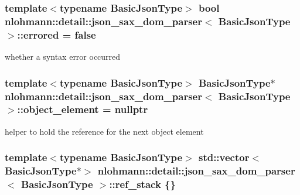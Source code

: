 \subsubsection[{\texorpdfstring{errored}{errored}}]{\setlength{\rightskip}{0pt plus 5cm}template$<$typename Basic\+Json\+Type$>$ bool {\bf nlohmann\+::detail\+::json\+\_\+sax\+\_\+dom\+\_\+parser}$<$ Basic\+Json\+Type $>$\+::errored = false\hspace{0.3cm}{\ttfamily [private]}}\hypertarget{classnlohmann_1_1detail_1_1json__sax__dom__parser_a31ccb472ed855e2f2370fd091d91aad7}{}\label{classnlohmann_1_1detail_1_1json__sax__dom__parser_a31ccb472ed855e2f2370fd091d91aad7}


whether a syntax error occurred 

\subsubsection[{\texorpdfstring{object\+\_\+element}{object_element}}]{\setlength{\rightskip}{0pt plus 5cm}template$<$typename Basic\+Json\+Type$>$ Basic\+Json\+Type$\ast$ {\bf nlohmann\+::detail\+::json\+\_\+sax\+\_\+dom\+\_\+parser}$<$ Basic\+Json\+Type $>$\+::object\+\_\+element = nullptr\hspace{0.3cm}{\ttfamily [private]}}\hypertarget{classnlohmann_1_1detail_1_1json__sax__dom__parser_a9c03c76d3a8e89c8928097ba0b92c2db}{}\label{classnlohmann_1_1detail_1_1json__sax__dom__parser_a9c03c76d3a8e89c8928097ba0b92c2db}


helper to hold the reference for the next object element 

\subsubsection[{\texorpdfstring{ref\+\_\+stack}{ref_stack}}]{\setlength{\rightskip}{0pt plus 5cm}template$<$typename Basic\+Json\+Type$>$ std\+::vector$<$Basic\+Json\+Type$\ast$$>$ {\bf nlohmann\+::detail\+::json\+\_\+sax\+\_\+dom\+\_\+parser}$<$ Basic\+Json\+Type $>$\+::ref\+\_\+stack \{\}\hspace{0.3cm}{\ttfamily [private]}}\hypertarget{classnlohmann_1_1detail_1_1json__sax__dom__parser_aa7526e7ae7be7f63803a23fd8cf36e5d}{}\label{classnlohmann_1_1detail_1_1json__sax__dom__parser_aa7526e7ae7be7f63803a23fd8cf36e5d}



